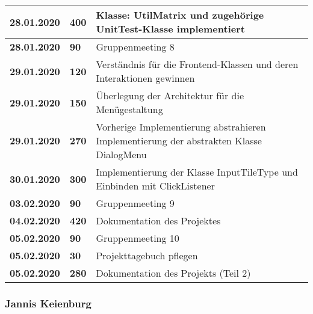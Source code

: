 {\begin{longtable}{|l|l|p{11cm}|}
		\textbf{28.01.2020} 
		& \textbf{\hfill400} & Klasse: UtilMatrix und zugehörige UnitTest-Klasse implementiert
		\\ \hline
		
		\textbf{28.01.2020} 
		& \textbf{\hfill90} & Gruppenmeeting 8
		\\ \hline
		
		\textbf{29.01.2020} 
		& \textbf{\hfill120} & Verständnis für die Frontend-Klassen und deren Interaktionen gewinnen
		\\ \hline
		
		\textbf{29.01.2020} 
		& \textbf{\hfill150} & Überlegung der Architektur für die Menügestaltung
		\\ \hline
		
		\textbf{29.01.2020} 
		& \textbf{\hfill270} & Vorherige Implementierung abstrahieren 
			Implementierung der abstrakten Klasse DialogMenu
		\\ \hline
		
		\textbf{30.01.2020} 
		& \textbf{\hfill300} & Implementierung der Klasse InputTileType und Einbinden mit ClickListener
		\\ \hline
		
		\textbf{03.02.2020} 
		& \textbf{\hfill90} & Gruppenmeeting 9
		\\ \hline
		
		\textbf{04.02.2020} 
		& \textbf{\hfill420} & Dokumentation des Projektes
		\\ \hline
		
		\textbf{05.02.2020} 
		& \textbf{\hfill90} & Gruppenmeeting 10
		\\ \hline
		
		\textbf{05.02.2020} 
		& \textbf{\hfill30} & Projekttagebuch pflegen
		\\ \hline
		
		\textbf{05.02.2020} 
		& \textbf{\hfill280} & Dokumentation des Projekts (Teil 2)	
		\\ \hline\hline
		
	\end{longtable}
}

\clearpage

\subsubsection{Jannis Keienburg}


